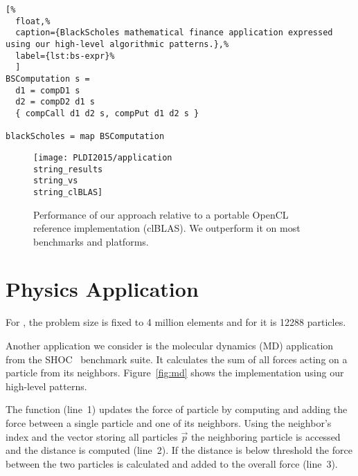 \begin{lstlisting}[%
  float,%
  caption={BlackScholes mathematical finance application expressed using our high-level algorithmic patterns.},%
  label={lst:bs-expr}%
  ]
BSComputation s =
  d1 = compD1 s
  d2 = compD2 d1 s
  { compCall d1 d2 s, compPut d1 d2 s }

blackScholes = map BSComputation
\end{lstlisting}
\begin{figure}[t]
  \texttt{[image: PLDI2015/application\\string\_results\\string\_vs\\string\_clBLAS]}
  \caption{Performance of our approach relative to a portable OpenCL reference implementation (clBLAS).
           We outperform it on most benchmarks and platforms.}
  \label{fig:clblas}
\end{figure}














\section{Physics Application}

For , the problem size is fixed to 4 million elements and for  it is 12288 particles.


Another application we consider is the molecular dynamics (MD) application from the SHOC~\cite{danalis10shoc} benchmark suite.
It calculates the sum of all forces acting on a particle from its neighbors.
Figure~\ref{fig:md} shows the implementation using our high-level patterns.

The function  (line~1) updates the force  of particle  by computing and adding the force between a single particle and one of its neighbors.
Using the neighbor's index  and the vector storing all particles $\vec{p}$ the neighboring particle is accessed and the distance is computed (line~2).
If the distance is below threshold  the force between the two particles is calculated and added to the overall force  (line~3).



